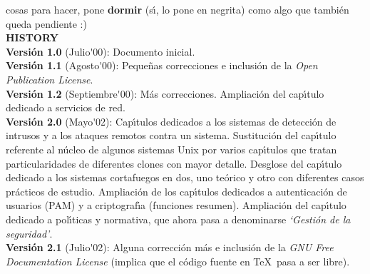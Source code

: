 cosas para hacer, pone {\bf dormir} (s\'{\i}, lo pone en negrita) como algo que 
tambi\'en queda pendiente :)
\vspace{1cm}\\
{\bf HISTORY}\\
{\bf Versi\'on 1.0} (Julio\'{}00): Documento inicial.\\
{\bf Versi\'on 1.1} (Agosto\'{}00): Peque\~nas correcciones e inclusi\'on de la
{\it Open Publication License}.\\
{\bf Versi\'on 1.2} (Septiembre\'{}00): M\'as correcciones. Ampliaci\'on del 
cap\'{\i}tulo dedicado a servicios de red.\\
{\bf Versi\'on 2.0} (Mayo\'{}02): Cap\'{\i}tulos dedicados a los sistemas de 
detecci\'on de intrusos y a los ataques remotos contra un sistema. Sustituci\'on
del cap\'{\i}tulo referente al n\'ucleo de algunos sistemas Unix por varios
cap\'{\i}tulos que tratan particularidades de diferentes clones con mayor 
detalle. Desglose del cap\'{\i}tulo dedicado a los sistemas cortafuegos en dos,
uno te\'orico y otro con diferentes casos pr\'acticos de estudio. Ampliaci\'on
de los cap\'{\i}tulos dedicados a autenticaci\'on de usuarios (PAM) y a 
criptograf\'{\i}a (funciones resumen). Ampliaci\'on del cap\'{\i}tulo dedicado
a pol\'{\i}ticas y normativa, que ahora pasa a denominarse {\it `Gesti\'on de
la seguridad'}.\\
{\bf Versi\'on 2.1} (Julio\'{}02): Alguna correcci\'on m\'as e inclusi\'on de
la {\it GNU Free Documentation License} (implica que el c\'odigo fuente en 
\TeX\ pasa a ser libre).

